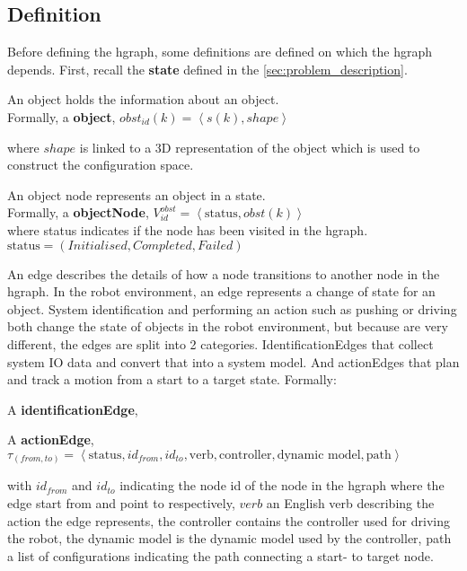 \subsection{Definition}%
\label{subsec:hgraph_definition}%
Before defining the \ac{hgraph}, some definitions are defined on which the \ac{hgraph} depends. First, recall the \textbf{state} defined in the \cref{sec:problem_description}.\bs

An object holds the information about an object.\\Formally, a \textbf{object},  $obst_{id}(k) = \left\langle s(k), shape \right\rangle $\bs

where $shape$ is linked to a 3D representation of the object which is used to construct the configuration space.\bs

An object node represents an object in a state.\\Formally, a \textbf{objectNode}, $V^{obst}_{id} =\left\langle \textrm{status}, obst(k)\right\rangle $\\where status indicates if the node has been visited in the \ac{hgraph}. $\textrm{status} = (Initialised, Completed, Failed)$\bs

An edge describes the details of how a node transitions to another node in the \ac{hgraph}. In the robot environment, an edge represents a change of state for an object. System identification and performing an action such as pushing or driving both change the state of objects in the robot environment, but because are very different, the edges are split into 2 categories. IdentificationEdges that collect system \ac{IO} data and convert that into a system model. And actionEdges that plan and track a motion from a start to a target state. Formally:\bs

A \textbf{identificationEdge},

A \textbf{actionEdge}, $\tau_{(from, to)} = \left\langle \textrm{status}, id_{from}, id_{to}, \textrm{verb}, \textrm{controller},\textrm{dynamic model}, \textrm{path}\right\rangle$\bs

with $id_{from}$ and $id_{to}$ indicating the node id of the node in the \ac{hgraph} where the edge start from and point to respectively, $verb$ an English verb describing the action the edge represents, the controller contains the controller used for driving the robot, the dynamic model is the dynamic model used by the controller, path a list of configurations indicating the path connecting a start- to target node.\bs
{}

